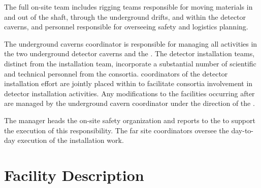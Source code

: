 The full on-site  team includes rigging teams responsible for moving 
materials in and out of the shaft, through the underground drifts, 
and within the detector caverns, and personnel responsible 
for overseeing safety and logistics planning. 

The underground caverns coordinator is responsible for managing all 
activities in the two underground detector caverns and the
. The detector installation teams, distinct from the   installation team, 
incorporate a substantial number of scientific and
technical personnel from the  consortia.   coordinators 
of the detector installation effort are jointly placed within 
  to facilitate consortia involvement in  
detector installation activities.  Any modifications to the facilities 
occurring after  are managed by the underground cavern 
coordinator under the direction of the .

The 
 manager heads the on-site safety organization and reports
to the  to support the execution of this
responsibility. The far site  coordinators %
oversee the day-to-day execution
of the installation work.

\section{Facility Description}
\label{sec:es-tc-facility}

